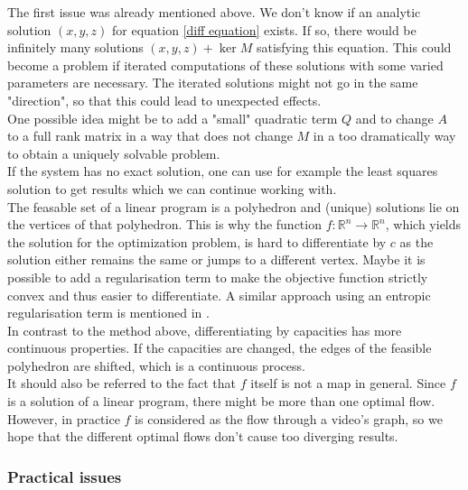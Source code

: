\documentclass{article}
\begin{document}
{The first issue was already mentioned above. We don't know if an analytic solution $(x,y,z)$ for equation \eqref{diff equation} exists. If so, there would be infinitely many solutions $(x,y,z)+ \ker M$ satisfying this equation. This could become a problem if iterated computations of these solutions with some varied parameters are necessary. The iterated solutions might not go in the same "direction", so that this could lead to unexpected effects. \\
One possible idea might be to add a "small" quadratic term $Q$ and to change $A$ to a full rank matrix in a way that does not change $M$ in a too dramatically way to obtain a uniquely solvable problem.\\
If the system has no exact solution, one can use for example the least squares solution to get results which we can continue working with.\\
The feasable set of a linear program is a polyhedron and (unique) solutions lie on the vertices of that polyhedron. This is why the function $f:\mathbb R^n \rightarrow \mathbb R^n$, which yields the solution for the optimization problem, is hard to differentiate by $c$ as the solution either remains the same or jumps to a different vertex. Maybe it is possible to add a regularisation term to make the objective function strictly convex and thus easier to differentiate. A similar approach using an entropic regularisation term is mentioned in \cite{Cut13}. \\
In contrast to the method above, differentiating by capacities has more continuous properties. If the capacities are changed, the edges of the feasible polyhedron are shifted, which is a continuous process.\\
It should also be referred to the fact that $f$ itself is not a map in general. Since $f$ is a solution of a linear program, there might be more than one optimal flow. However, in practice $f$ is considered as the flow through a video's graph, so we hope that the different optimal flows don't cause too diverging results. 



\subsubsection{Practical issues}

}
\end{document}

